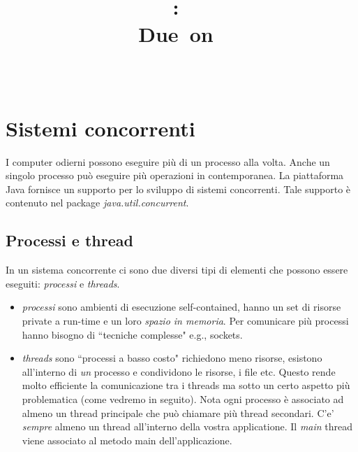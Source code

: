 \documentclass{article}
\title{
\vspace{2in}
\textmd{\textbf{\hmwkClass:\ \hmwkTitle}}\\
\normalsize\vspace{0.1in}\small{Due\ on\ \hmwkDueDate}\\
\vspace{0.1in}\large{\textit{\hmwkClassInstructor\ \hmwkClassTime}}
\vspace{3in}
}
\author{\textbf{\hmwkAuthorName}}
\date{} %
\begin{document}
\maketitle



\newpage
\tableofcontents
\newpage



\section{Sistemi concorrenti}
I computer odierni possono eseguire pi\`u di un processo alla volta.  Anche un singolo processo pu\`o eseguire pi\`u operazioni in contemporanea. La piattaforma Java fornisce un supporto per lo sviluppo di sistemi concorrenti. Tale supporto \`e contenuto nel package \emph{java.util.concurrent}.

\subsection{Processi e thread}
In un sistema concorrente ci sono due diversi tipi di elementi che possono essere eseguiti: \emph{processi} e \emph{threads}. 
\begin{itemize}
\item \emph{processi} sono ambienti di esecuzione self-contained, hanno un set di risorse private a run-time e un loro \emph{spazio in memoria}. Per comunicare pi\`u processi hanno bisogno di ``tecniche complesse" e.g., sockets.
\item \emph{threads} sono ``processi a basso costo" richiedono meno risorse, esistono all'interno di \emph{un} processo e condividono le risorse, i file etc. Questo rende molto efficiente la comunicazione tra i threads ma sotto un certo aspetto pi\`u problematica (come vedremo in seguito). Nota ogni processo \`e associato ad almeno un thread principale che pu\`o chiamare pi\`u thread secondari. C'e' \emph{sempre} almeno un thread all'interno della vostra applicatione. Il \emph{main} thread viene associato al metodo main dell'applicazione. 
\end{itemize}
\end{document}
